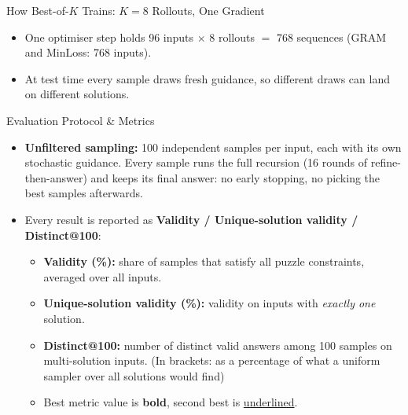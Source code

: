 \documentclass[aspectratio=169,10pt]{beamer}
\newcommand{\secbest}[1]{\underline{#1}}
\newcommand{\Bok}{Best-of-$K$}
\begin{document}
\begin{frame}{How \Bok{} Trains: $K=8$ Rollouts, One Gradient}
  \vspace{0.3em}
  \raggedright\footnotesize
  \begin{itemize}\setlength{\itemsep}{0.15em}
    \item One optimiser step holds 96 inputs $\times$ 8 rollouts $=$ 768 sequences (GRAM and MinLoss: 768 inputs).
    \item At test time every sample draws fresh guidance, so different draws can land on different solutions.
  \end{itemize}
\end{frame}

\begin{frame}{Evaluation Protocol \& Metrics}
  \begin{itemize}\setlength{\itemsep}{0.6em}
    \item \textbf{Unfiltered sampling:} 100 independent samples per input, each with its own stochastic guidance. Every sample runs the full recursion (16 rounds of refine-then-answer) and keeps its final answer: no early stopping, no picking the best samples afterwards.
    \item Every result is reported as \textbf{Validity / Unique-solution validity / Distinct@100}:
      \begin{itemize}\setlength{\itemsep}{0.35em}
        \item \textbf{Validity (\%):} share of samples that satisfy all puzzle constraints, averaged over all inputs.
        \item \textbf{Unique-solution validity (\%):} validity on inputs with \emph{exactly one} solution.
        \item \textbf{Distinct@100:} number of distinct valid answers among 100 samples on multi-solution inputs. (In brackets: as a percentage of what a uniform sampler over all solutions would find)
        \item Best metric value is \textbf{bold}, second best is \secbest{underlined}.
      \end{itemize}
  \end{itemize}
\end{frame}


\end{document}
